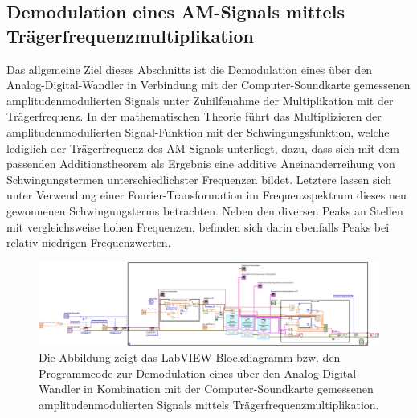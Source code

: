 \documentclass[
a4paper,
12pt,
pagesize,
ngerman
]{scrartcl}
\begin{document}
	\subsection{Demodulation eines AM-Signals mittels Trägerfrequenzmultiplikation} \label{DemodTraeger}
	
	Das allgemeine Ziel dieses Abschnitts ist die Demodulation eines über den Analog-Digital-Wandler in Verbindung mit der Computer-Soundkarte gemessenen amplitudenmodulierten Signals unter Zuhilfenahme der Multiplikation mit der Trägerfrequenz. %
	In der mathematischen Theorie führt das Multiplizieren der amplitudenmodulierten Signal-Funktion mit der Schwingungsfunktion, welche lediglich der Trägerfrequenz des AM-Signals unterliegt, dazu, dass sich mit dem passenden Additionstheorem als Ergebnis eine additive Aneinanderreihung von Schwingungstermen unterschiedlichster Frequenzen bildet. %
	Letztere lassen sich unter Verwendung einer Fourier-Transformation im Frequenzspektrum dieses neu gewonnenen Schwingungsterms betrachten. %
	Neben den diversen Peaks an Stellen mit vergleichsweise hohen Frequenzen, befinden sich darin ebenfalls Peaks bei relativ niedrigen Frequenzwerten. %
		
	\begin{figure}[H] %
		\centering
		\includegraphics[width=1.0\textwidth]{EIRE2018Dateien/Tag4/traegerMultOszi/Oszilloskop__modifiziertd}
		\caption{Die Abbildung zeigt das LabVIEW-Blockdiagramm bzw. den Programmcode zur Demodulation eines über den Analog-Digital-Wandler in Kombination mit der Computer-Soundkarte gemessenen amplitudenmodulierten Signals mittels Trägerfrequenzmultiplikation.} %
		\label{MultiTraegerProgrammcode}
	\end{figure}
\end{document}

